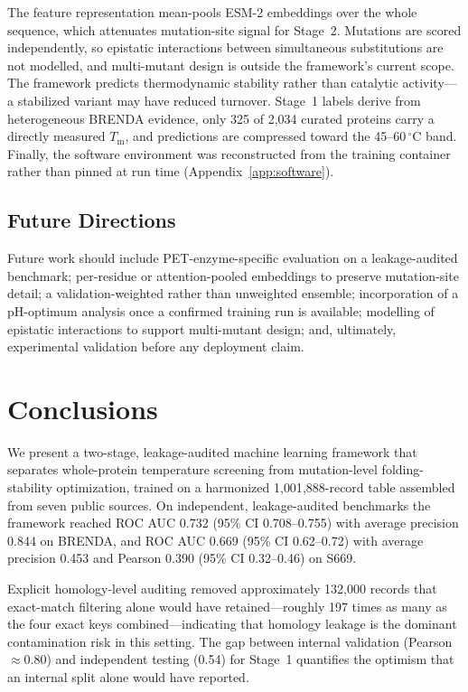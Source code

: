 \documentclass[journal,article,submit,moreauthors]{Definitions/mdpi}
\newcommand{\Tm}{\ensuremath{T_\mathrm{m}}}
\begin{document}
The feature representation mean-pools ESM-2 embeddings over the whole sequence, which
attenuates mutation-site signal for Stage~2. Mutations are scored independently, so
epistatic interactions between simultaneous substitutions are not modelled, and multi-mutant
design is outside the framework's current scope. The framework predicts thermodynamic
stability rather than catalytic activity---a stabilized variant may have reduced turnover.
Stage~1 labels derive from heterogeneous BRENDA evidence, only 325 of 2{,}034 curated
proteins carry a directly measured \Tm, and predictions are compressed toward the
45--60\,$^{\circ}$C band. Finally, the software environment was reconstructed from the
training container rather than pinned at run time (Appendix~\ref{app:software}).

\subsection{Future Directions}
\label{sec:future}

Future work should include PET-enzyme-specific evaluation on a leakage-audited benchmark;
per-residue or attention-pooled embeddings to preserve mutation-site detail; a
validation-weighted rather than unweighted ensemble; incorporation of a pH-optimum analysis
once a confirmed training run is available; modelling of epistatic interactions to support
multi-mutant design; and, ultimately, experimental validation before any deployment claim.

\section{Conclusions}

We present a two-stage, leakage-audited machine learning framework that separates
whole-protein temperature screening from mutation-level folding-stability optimization,
trained on a harmonized 1{,}001{,}888-record table assembled from seven public sources. On
independent, leakage-audited benchmarks the framework reached ROC AUC 0.732 (95\% CI
0.708--0.755) with average precision 0.844 on BRENDA, and ROC AUC 0.669 (95\% CI 0.62--0.72)
with average precision 0.453 and Pearson 0.390 (95\% CI 0.32--0.46) on S669.

Explicit homology-level auditing removed approximately 132{,}000 records that exact-match
filtering alone would have retained---roughly 197 times as many as the four exact keys
combined---indicating that homology leakage is the dominant contamination risk in this
setting. The gap between internal validation (Pearson $\approx$0.80) and independent
testing (0.54) for Stage~1 quantifies the optimism that an internal split alone would have
reported.
\end{document}
